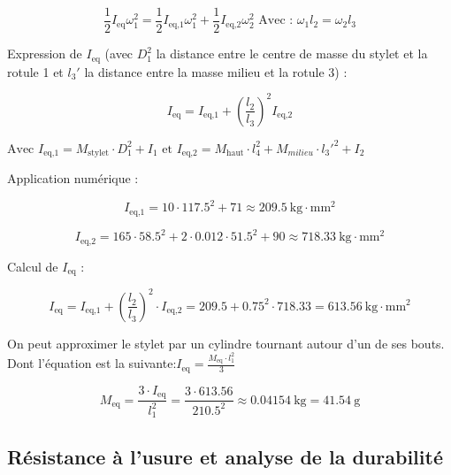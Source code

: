 \documentclass[a4paper, 11pt]{article} %
\begin{document}
\begin{equation}
\frac{1}{2} I_{\text{eq}} \omega_1^2 = \frac{1}{2} I_{\text{eq,1}} \omega_1^2 + \frac{1}{2} I_{\text{eq,2}} \omega_2^2 \text {  Avec : } \omega_1l_2 = \omega_2l_3
\end{equation}

Expression de $I_{\text{eq}}$ (avec $D_1^2$  la distance entre le centre de masse du stylet et la rotule 1 et $l_3'$  la distance entre la masse milieu et la rotule 3) :

\begin{equation}
I_{\text{eq}} = I_{\text{eq,1}} + \left( \frac{l_2}{l_3} \right)^2 I_{\text{eq,2}} 
\end{equation}

$\text{Avec  } I_{\text{eq,1}} = M_{\text{stylet}} \cdot D_1^2 + I_1\text { et } I_{\text{eq,2}} = M_{\text{haut}} \cdot l_4^2 + M_{milieu} \cdot l_3'^2 + I_2$






Application numérique :

\begin{equation}
I_{\text{eq,1}} = 10 \cdot 117.5^2 + 71 \approx 209.5 ~\text{kg} \cdot \text{mm}^2
\end{equation}

\begin{equation}
I_{\text{eq,2}} = 165 \cdot 58.5^2 + 2 \cdot 0.012 \cdot 51.5^2 + 90 \approx 718.33~\text{kg} \cdot \text{mm}^2
\end{equation}

\bigskip

Calcul de $I_{\text{eq}}$ :

\begin{equation}
I_{\text{eq}} = I_{\text{eq,1}} + \left( \frac{l_2}{l_3} \right)^2 \cdot I_{\text{eq,2}} = 209.5 + 0.75^2 \cdot 718.33 = 613.56~\text{kg} \cdot \text{mm}^2
\end{equation}

On peut approximer le stylet par un cylindre tournant autour d'un de ses bouts. Dont l'équation est la suivante:$ I_{\text{eq}} = \frac{M_{\text{eq}}\cdot l_1^2}{3}$

\begin{equation}
M_{\text{eq}} = \frac{3 \cdot I_{\text{eq}}}{l_1^2} = \frac{3 \cdot613.56}{ 210.5^2} \approx 0.04154\ \text{kg} = 41.54\ \text{g}
\end{equation}


\subsection{Résistance à l’usure et analyse de la durabilité}
\end{document}
